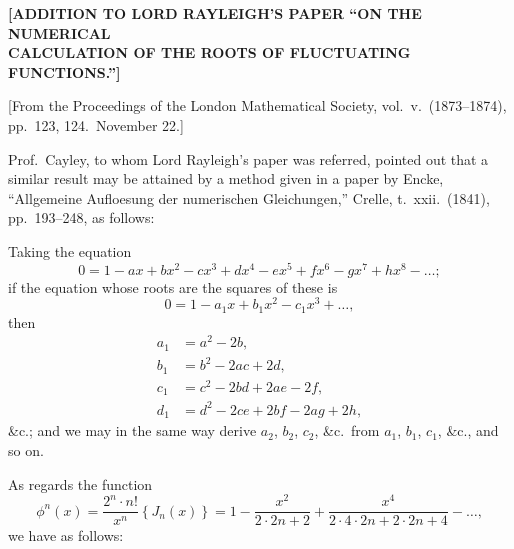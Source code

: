 \documentclass[11pt,a4paper]{book}
\begin{document}
\begin{center}
{\large \textbf{[ADDITION TO LORD RAYLEIGH'S PAPER ``ON THE NUMERICAL}}\\[4pt]
{\large \textbf{CALCULATION OF THE ROOTS OF FLUCTUATING FUNCTIONS.'']}}
\end{center}

\begin{flushright}
{\small [From the Proceedings of the London Mathematical Society, vol.\ v.\ (1873--1874), pp.\ 123, 124.\ November 22.]}
\end{flushright}

Prof.\ Cayley, to whom Lord Rayleigh's paper was referred, pointed out that a similar result may be attained by a method given in a paper by Encke, ``Allgemeine Aufloesung der numerischen Gleichungen,'' Crelle, t.\ xxii.\ (1841), pp.\ 193--248, as follows:

Taking the equation
\[
0 = 1 - ax + bx^2 - cx^3 + dx^4 - ex^5 + fx^6 - gx^7 + hx^8 - \ldots;
\]
if the equation whose roots are the squares of these is
\[
0 = 1 - a_1 x + b_1 x^2 - c_1 x^3 + \ldots,
\]
then
\begin{align*}
a_1 &= a^2 - 2b,\\
b_1 &= b^2 - 2ac + 2d,\\
c_1 &= c^2 - 2bd + 2ae - 2f,\\
d_1 &= d^2 - 2ce + 2bf - 2ag + 2h,
\end{align*}
\&c.; and we may in the same way derive $a_2$, $b_2$, $c_2$, \&c.\ from $a_1$, $b_1$, $c_1$, \&c., and so on.

As regards the function
\[
\phi^n(x) = \frac{2^n \cdot n!}{x^n}\left\{J_n(x)\right\} = 1 - \frac{x^2}{2 \cdot 2n + 2} + \frac{x^4}{2 \cdot 4 \cdot 2n + 2 \cdot 2n + 4} - \ldots,
\]
we have as follows:

\newpage
\setcounter{page}{20}
\end{document}
